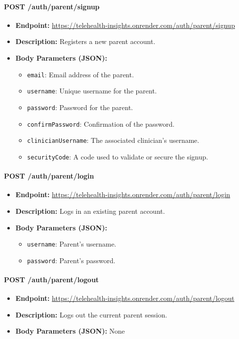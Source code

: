 \documentclass{article}
\begin{document}
\paragraph{POST /auth/parent/signup}
\begin{itemize}
    \item \textbf{Endpoint:} 
        \url{https://telehealth-insights.onrender.com/auth/parent/signup}
    \item \textbf{Description:} Registers a new parent account.
    \item \textbf{Body Parameters (JSON):}
    \begin{itemize}
        \item \texttt{email}: Email address of the parent.
        \item \texttt{username}: Unique username for the parent.
        \item \texttt{password}: Password for the parent.
        \item \texttt{confirmPassword}: Confirmation of the password.
        \item \texttt{clinicianUsername}: The associated clinician’s username.
        \item \texttt{securityCode}: A code used to validate or secure the signup.
    \end{itemize}
\end{itemize}

\paragraph{POST /auth/parent/login}
\begin{itemize}
    \item \textbf{Endpoint:} 
        \url{https://telehealth-insights.onrender.com/auth/parent/login}
    \item \textbf{Description:} Logs in an existing parent account.
    \item \textbf{Body Parameters (JSON):}
    \begin{itemize}
        \item \texttt{username}: Parent’s username.
        \item \texttt{password}: Parent’s password.
    \end{itemize}
\end{itemize}

\paragraph{POST /auth/parent/logout}
\begin{itemize}
    \item \textbf{Endpoint:} 
        \url{https://telehealth-insights.onrender.com/auth/parent/logout}
    \item \textbf{Description:} Logs out the current parent session.
    \item \textbf{Body Parameters (JSON):} None
\end{itemize}
\end{document}
